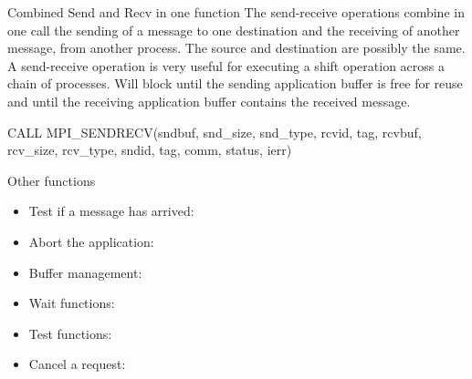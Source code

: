 \documentclass[aspectratio=43]{beamer}
\begin{document}
\begin{frame}[fragile]{Combined Send and Recv in one function}
\justifying
The send-receive operations combine in one call the sending of a message to one destination and the receiving of another message, from another process.
The source and destination are possibly the same.
A send-receive operation is very useful for executing a shift operation across a chain of processes.
Will block until the sending application buffer is free for reuse and until the receiving application buffer contains the received message.
\begin{Fortranlisting}[]{}
CALL MPI_SENDRECV(sndbuf, snd_size, snd_type, rcvid, tag,
                  rcvbuf, rcv_size, rcv_type, sndid, tag,
                  comm, status, ierr)
\end{Fortranlisting}
\end{frame}

\begin{frame}[fragile]{Other functions}
\begin{itemize}
\item Test if a message has arrived:\\\hspace{1cm}
\item Abort the application:\\\hspace{1cm}
\item Buffer management:\\\hspace{1cm}
\item Wait functions:\\\hspace{1cm}
\item Test functions:\\\hspace{1cm}
\item Cancel a request:\\\hspace{1cm}
\end{itemize}
\end{frame}
\end{document}
